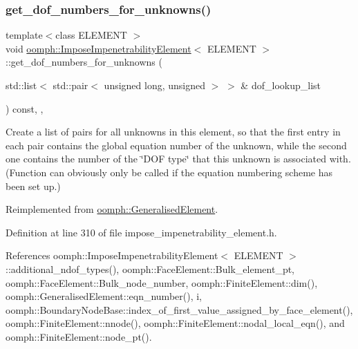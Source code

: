 \mbox{\label{classoomph_1_1ImposeImpenetrabilityElement_a722461f623710d20a71a28b5fa6018a9}} 
\subsubsection{\texorpdfstring{get\+\_\+dof\+\_\+numbers\+\_\+for\+\_\+unknowns()}{get\_dof\_numbers\_for\_unknowns()}}
{\footnotesize\ttfamily template$<$class E\+L\+E\+M\+E\+NT $>$ \\
void \hyperlink{classoomph_1_1ImposeImpenetrabilityElement}{oomph\+::\+Impose\+Impenetrability\+Element}$<$ E\+L\+E\+M\+E\+NT $>$\+::get\+\_\+dof\+\_\+numbers\+\_\+for\+\_\+unknowns (\begin{DoxyParamCaption}\item[{std\+::list$<$ std\+::pair$<$ unsigned long, unsigned $>$ $>$ \&}]{dof\+\_\+lookup\+\_\+list }\end{DoxyParamCaption}) const\hspace{0.3cm}{\ttfamily [inline]}, {\ttfamily [protected]}, {\ttfamily [virtual]}}



Create a list of pairs for all unknowns in this element, so that the first entry in each pair contains the global equation number of the unknown, while the second one contains the number of the \char`\"{}\+D\+O\+F type\char`\"{} that this unknown is associated with. (Function can obviously only be called if the equation numbering scheme has been set up.) 



Reimplemented from \hyperlink{classoomph_1_1GeneralisedElement_a069f59bfc3e607a5bebba52c6314d777}{oomph\+::\+Generalised\+Element}.



Definition at line 310 of file impose\+\_\+impenetrability\+\_\+element.\+h.



References oomph\+::\+Impose\+Impenetrability\+Element$<$ E\+L\+E\+M\+E\+N\+T $>$\+::additional\+\_\+ndof\+\_\+types(), oomph\+::\+Face\+Element\+::\+Bulk\+\_\+element\+\_\+pt, oomph\+::\+Face\+Element\+::\+Bulk\+\_\+node\+\_\+number, oomph\+::\+Finite\+Element\+::dim(), oomph\+::\+Generalised\+Element\+::eqn\+\_\+number(), i, oomph\+::\+Boundary\+Node\+Base\+::index\+\_\+of\+\_\+first\+\_\+value\+\_\+assigned\+\_\+by\+\_\+face\+\_\+element(), oomph\+::\+Finite\+Element\+::nnode(), oomph\+::\+Finite\+Element\+::nodal\+\_\+local\+\_\+eqn(), and oomph\+::\+Finite\+Element\+::node\+\_\+pt().

